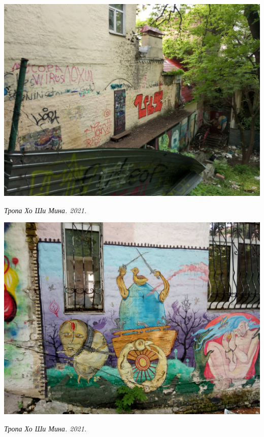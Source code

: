 \begin{center}
\includegraphics[width=\linewidth]{rpix/IMG_20210601_134945.jpg}

\textit{Тропа Хо Ши Мина. 2021.}
\end{center}



\begin{center}
\includegraphics[width=\linewidth]{rpix/IMG_20210601_135238.jpg}

\textit{Тропа Хо Ши Мина. 2021.}
\end{center}


